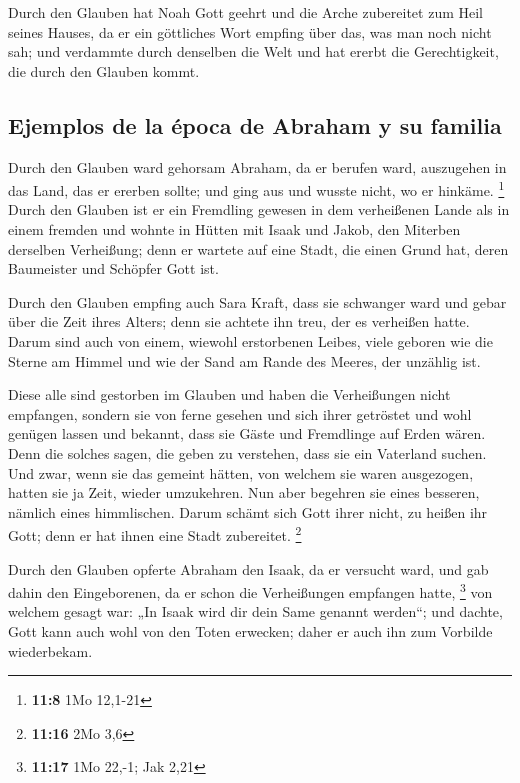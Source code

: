  Durch den Glauben hat Noah Gott geehrt und die Arche
zubereitet zum Heil seines Hauses, da er ein göttliches Wort empfing
über das, was man noch nicht sah; und verdammte durch denselben die Welt
und hat ererbt die Gerechtigkeit, die durch den Glauben kommt.

\hypertarget{ejemplos-de-la-uxe9poca-de-abraham-y-su-familia}{%
\subsection{Ejemplos de la época de Abraham y su
familia}\label{ejemplos-de-la-uxe9poca-de-abraham-y-su-familia}}

 Durch den Glauben ward gehorsam Abraham, da er berufen
ward, auszugehen in das Land, das er ererben sollte; und ging aus und
wusste nicht, wo er hinkäme. \footnote{\textbf{11:8} 1Mo 12,1-21}
 Durch den Glauben ist er ein Fremdling gewesen in dem
verheißenen Lande als in einem fremden und wohnte in Hütten mit Isaak
und Jakob, den Miterben derselben Verheißung;  denn er
wartete auf eine Stadt, die einen Grund hat, deren Baumeister und
Schöpfer Gott ist.

 Durch den Glauben empfing auch Sara Kraft, dass sie
schwanger ward und gebar über die Zeit ihres Alters; denn sie achtete
ihn treu, der es verheißen hatte.  Darum sind auch von
einem, wiewohl erstorbenen Leibes, viele geboren wie die Sterne am
Himmel und wie der Sand am Rande des Meeres, der unzählig ist.

 Diese alle sind gestorben im Glauben und haben die
Verheißungen nicht empfangen, sondern sie von ferne gesehen und sich
ihrer getröstet und wohl genügen lassen und bekannt, dass sie Gäste und
Fremdlinge auf Erden wären.  Denn die solches sagen, die
geben zu verstehen, dass sie ein Vaterland suchen.  Und
zwar, wenn sie das gemeint hätten, von welchem sie waren ausgezogen,
hatten sie ja Zeit, wieder umzukehren.  Nun aber begehren
sie eines besseren, nämlich eines himmlischen. Darum schämt sich Gott
ihrer nicht, zu heißen ihr Gott; denn er hat ihnen eine Stadt
zubereitet. \footnote{\textbf{11:16} 2Mo 3,6}

 Durch den Glauben opferte Abraham den Isaak, da er
versucht ward, und gab dahin den Eingeborenen, da er schon die
Verheißungen empfangen hatte, \footnote{\textbf{11:17} 1Mo 22,-1; Jak
  2,21}  von welchem gesagt war: „In Isaak wird dir dein
Same genannt werden``;  und dachte, Gott kann auch wohl
von den Toten erwecken; daher er auch ihn zum Vorbilde wiederbekam.

